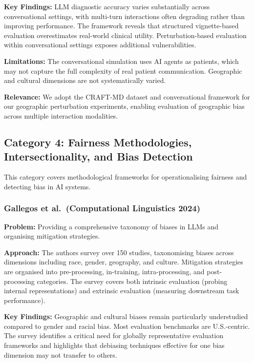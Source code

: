 \documentclass[12pt,a4paper]{article}
\begin{document}
\textbf{Key Findings:} LLM diagnostic accuracy varies substantially across conversational settings, with multi-turn interactions often degrading rather than improving performance. The framework reveals that structured vignette-based evaluation overestimates real-world clinical utility. Perturbation-based evaluation within conversational settings exposes additional vulnerabilities.

\textbf{Limitations:} The conversational simulation uses AI agents as patients, which may not capture the full complexity of real patient communication. Geographic and cultural dimensions are not systematically varied.

\textbf{Relevance:} We adopt the CRAFT-MD dataset and conversational framework for our geographic perturbation experiments, enabling evaluation of geographic bias across multiple interaction modalities.


\subsection{Category 4: Fairness Methodologies, Intersectionality, and Bias Detection}

This category covers methodological frameworks for operationalising fairness and detecting bias in AI systems.

\subsubsection{Gallegos et al.\ (Computational Linguistics 2024)~\cite{gallegos2024}}
\textbf{Problem:} Providing a comprehensive taxonomy of biases in LLMs and organising mitigation strategies.

\textbf{Approach:} The authors survey over 150 studies, taxonomising biases across dimensions including race, gender, geography, and culture. Mitigation strategies are organised into pre-processing, in-training, intra-processing, and post-processing categories. The survey covers both intrinsic evaluation (probing internal representations) and extrinsic evaluation (measuring downstream task performance).

\textbf{Key Findings:} Geographic and cultural biases remain particularly understudied compared to gender and racial bias. Most evaluation benchmarks are U.S.-centric. The survey identifies a critical need for globally representative evaluation frameworks and highlights that debiasing techniques effective for one bias dimension may not transfer to others.
\end{document}
